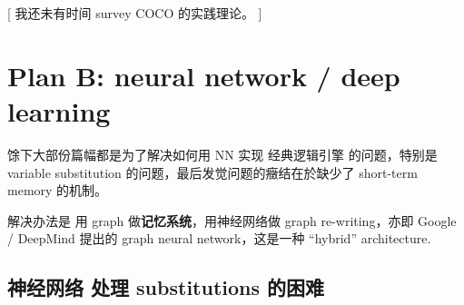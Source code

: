 \documentclass[12pt, orivec]{article}
\newcommand{\cc}[2]{#1}
\newcommand{\cc}[2]{#2}
\begin{document}
\cc{[ 我还未有时间 survey COCO 的实践理论。 ]
}{
[I have not had time to explore the practical theory of COCO. ]}

\section{Plan B: neural network / deep learning}

\cc{馀下大部份篇幅都是为了解决如何用 NN 实现 经典逻辑引擎 的问题，特别是 variable substitution 的问题，最后发觉问题的癥结在於缺少了 short-term memory 的机制。
}{
Most of the time is to solve the problem of how to implement the classic logic engine with NN, especially the problem of variable substitution. Finally, the crux of the problem is the lack of short-term memory mechanism.}

\cc{解决办法是 用 graph 做\textbf{记忆系统}，用神经网络做 graph re-writing，亦即 Google / DeepMind 提出的 graph neural network，这是一种 ``hybrid'' architecture.
}{
The solution is to use graph as \textbf{memory system} and use neural network for graph re-writing, which is the graph neural network proposed by Google / DeepMind. This is a ``hybrid'' architecture.}

\subsection{\cc{神经网络 处理 substitutions 的困难}{NNs have difficulty handling substitutions}}
\label{NN}
\end{document}
